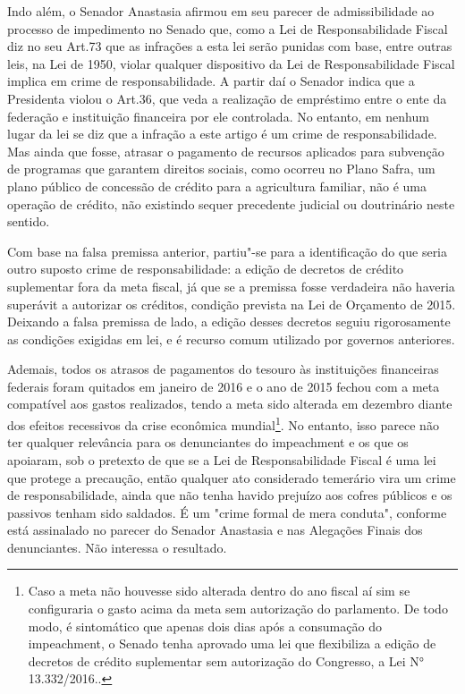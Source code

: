Indo além, o Senador Anastasia afirmou em seu parecer de admissibilidade
ao processo de impedimento no Senado que, como a Lei de Responsabilidade
Fiscal diz no seu Art.73 que as infrações a esta lei serão punidas com
base, entre outras leis, na Lei de 1950, violar qualquer dispositivo da
Lei de Responsabilidade Fiscal implica em crime de responsabilidade. A
partir daí o Senador indica que a Presidenta violou o Art.36, que veda a
realização de empréstimo entre o ente da federação e instituição
financeira por ele controlada. No entanto, em nenhum lugar da lei se diz
que a infração a este artigo é um crime de responsabilidade. Mas ainda
que fosse, atrasar o pagamento de recursos aplicados para subvenção de
programas que garantem direitos sociais, como ocorreu no Plano Safra, um
plano público de concessão de crédito para a agricultura familiar, não é
uma operação de crédito, não existindo sequer precedente judicial ou
doutrinário neste sentido.

Com base na falsa premissa anterior, partiu"-se para a identificação do
que seria outro suposto crime de responsabilidade: a edição de decretos
de crédito suplementar fora da meta fiscal, já que se a premissa fosse
verdadeira não haveria superávit a autorizar os créditos, condição
prevista na Lei de Orçamento de 2015. Deixando a falsa premissa de lado,
a edição desses decretos seguiu rigorosamente as condições exigidas em
lei, e é recurso comum utilizado por governos anteriores.

Ademais, todos os atrasos de pagamentos do tesouro às instituições
financeiras federais foram quitados em janeiro de 2016 e o ano de 2015
fechou com a meta compatível aos gastos realizados, tendo a meta sido
alterada em dezembro diante dos efeitos recessivos da crise econômica
mundial\footnote{Caso a meta não houvesse sido alterada dentro do ano
  fiscal aí sim se configuraria o gasto acima da meta sem autorização do
  parlamento. De todo modo, é sintomático que apenas dois dias após a
  consumação do impeachment, o Senado tenha aprovado uma lei que
  flexibiliza a edição de decretos de crédito suplementar sem
  autorização do Congresso, a Lei N° 13.332/2016..}. No entanto, isso
parece não ter qualquer relevância para os denunciantes do impeachment e
os que os apoiaram, sob o pretexto de que se a Lei de Responsabilidade
Fiscal é uma lei que protege a precaução, então qualquer ato considerado
temerário vira um crime de responsabilidade, ainda que não tenha havido
prejuízo aos cofres públicos e os passivos tenham sido saldados. É um
"crime formal de mera conduta", conforme está assinalado no parecer do
Senador Anastasia e nas Alegações Finais dos denunciantes. Não interessa
o resultado.

